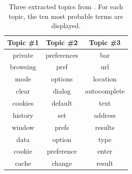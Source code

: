 
\begin{table}[t]
    \footnotesize
    \centering
	\setlength{\tabcolsep}{15.0pt}%
	\renewcommand{\arraystretch}{1.0}
    \caption[The three extracted topics with the highest probability from the exemplary bug report]
    {Three extracted topics from \mozff{}.
    For each topic, the ten most probable terms are displayed.
    }
    \begin{tabular}{c|c|c}
    \toprule
    \textbf{Topic \#1} & \textbf{Topic \#2} & \textbf{Topic \#3} \\ \midrule
     private & preferences &          bar \\
    browsing &        pref &          url \\
        mode &     options &     location \\
       clear &      dialog & autocomplete \\
     cookies &     default &         text \\
     history &         set &      address \\
      window &       prefs &      results \\
        data &      option &         type \\
      cookie &  preference &        enter \\
       cache &      change &       result \\\hline

    \end{tabular}
    \label{tab:topics_ff}
\end{table}
